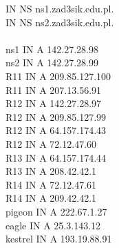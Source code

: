 \documentclass{article}
\begin{document}
\hspace{4cm} IN NS ns1.zad3sik.edu.pl. \\
\hspace*{4cm} IN NS ns2.zad3sik.edu.pl. \\
\\
ns1 \hspace{3.8cm} IN A 142.27.28.98\\
ns2 \hspace{3.8cm} IN A 142.27.28.99 \\
R11 \hspace{3.7cm} IN A 209.85.127.100 \\
R11 \hspace{3.7cm} IN A 207.13.56.91 \\
R12 \hspace{3.7cm} IN A 142.27.28.97 \\
R12 \hspace{3.7cm} IN A 209.85.127.99 \\
R12 \hspace{3.7cm} IN A 64.157.174.43 \\
R12 \hspace{3.7cm} IN A 72.12.47.60 \\
R13 \hspace{3.7cm} IN A 64.157.174.44 \\
R13 \hspace{3.7cm} IN A 208.42.42.1 \\
R14 \hspace{3.7cm} IN A 72.12.47.61 \\
R14 \hspace{3.7cm} IN A 209.42.42.1 \\
pigeon \hspace{3.3cm} IN A 222.67.1.27 \\
eagle \hspace{3.55cm} IN A 25.3.143.12 \\
kestrel \hspace{3.3cm} IN A 193.19.88.91 \\
\end{document}
